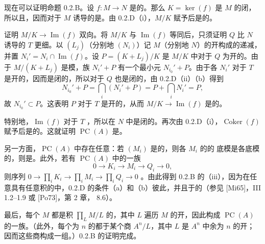 现在可以证明命题 0.2.B。设 $f:M\to N$ 是的。那么 $K=\ker(f)$ 是 $M$ 的闭，所以且，因而对于 $M$ 诱导的是。由 0.2.D（i），$M/K$ 赋予后是的。

证明 $M/K\to\operatorname{Im}(f)$ 双向。将 $M/K$ 与 $\operatorname{Im}(f)$ 等同后，只须证明 $Q$ 比 $N$ 诱导的 $T$ 更细。以 $(L_j)$（分别地 $(N_i)$）记 $M$（分别地 $N$）的开构成的递减，并置 $N_i'=N_i\cap\operatorname{Im}(f)$。设 $P=(K+L_j)/K$ 是 $M/K$ 中对于 $Q$ 为开的。由于 $M/(K+L_j)$ 是模，族 $N_i'+P$ 有一个最小元 $N_{i_0}'+P$。由于各 $N_i'$ 对于 $T$ 是开的，因而是闭的，所以对于 $Q$ 也是闭的，由 0.2.D（ii）（b）得到
\[
 N_{i_0}'+P=\bigcap_i(N_i'+P)=P+\bigcap_iN_i'=P,
\]
故 $N_{i_0}'\subset P$。这表明 $P$ 对于 $T$ 是开的，从而 $M/K\to\operatorname{Im}(f)$ 是的。

特别地，$\operatorname{Im}(f)$ 对于 $T$ ，所以在 $N$ 中是闭的。再次由 0.2.D（i），$\operatorname{Coker}(f)$ 赋予后是的。这就证明 $\operatorname{PC}(A)$ 是。

另一方面，$\operatorname{PC}(A)$ 中存在任意：若 $(M_i)$ 是的，则各 $M_i$ 的的
底模是各底模的，则是。此外，若有 $\operatorname{PC}(A)$ 中的一族
\[0\longrightarrow K_i\longrightarrow M_i\longrightarrow Q_i\longrightarrow0,\]
则序列 $0\to\prod_iK_i\to\prod_iM_i\to\prod_iQ_i\to0$ 。由此得到 0.2.B 的（iii），因为在任意具有任意积的中，0.2.D 的条件（a）和（b）彼此，并且于的（参见 [Mi65]，III 1.2--1.9 或 [Po73]，第 2 章， 8.6）。

最后，每个 $M$ 都是积 $\prod_LM/L$ 的，其中 $L$ 遍历 $M$ 的开，因此构成 $\operatorname{PC}(A)$ 的一族。（此外，每个为 $n$ 的都于某个商 $A^n/L$，其中 $L$ 是 $A^n$ 中余为 $n$ 的开；因而这些商构成一组。）0.2.B 的证明完成。

